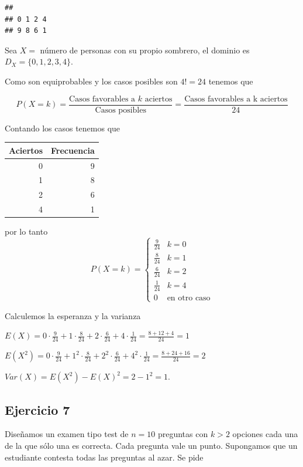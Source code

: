\documentclass[]{article}
\newenvironment{Shaded}{\begin{snugshade}}{\end{snugshade}}
\newcommand{\KeywordTok}[1]{\textcolor[rgb]{0.13,0.29,0.53}{\textbf{#1}}}
\newcommand{\NormalTok}[1]{#1}
\newcommand{\OperatorTok}[1]{\textcolor[rgb]{0.81,0.36,0.00}{\textbf{#1}}}
\begin{document}
\begin{Shaded}
\end{Shaded}

\begin{verbatim}
## 
## 0 1 2 4 
## 9 8 6 1
\end{verbatim}

Sea \(X=\) número de personas con su propio sombrero, el dominio es
\(D_X=\{0,1,2,3,4\}\).

Como son equiprobables y los casos posibles son \(4!=24\) tenemos que

\[P(X=k)=\frac{\mbox{Casos favorables a $k$ aciertos}}{\mbox{Casos posibles}}=\frac{\mbox{Casos favorables a k aciertos}}{24}\]

Contando los casos tenemos que

\begin{longtable}[]{@{}rr@{}}
\toprule
Aciertos & Frecuencia\tabularnewline
\midrule
\endhead
0 & 9\tabularnewline
1 & 8\tabularnewline
2 & 6\tabularnewline
4 & 1\tabularnewline
\bottomrule
\end{longtable}

por lo tanto \[P(X=k)=\left\{
\begin{array}{lr}
\frac{9}{24} & k=0\\
\frac{8}{24} & k=1\\
\frac{6}{24} & k=2\\
\frac{1}{24} & k=4\\
0 & \mbox{en otro caso}
\end{array}
\right.
\]

Calculemos la esperanza y la varianza

\(E(X)= 0\cdot \frac{9}{24} +1\cdot \frac{8}{24} + 2 \cdot \frac{6}{24} + 4 \cdot \frac{1}{24} =\frac{8+12+4}{24}=1\)

\(E(X^2)= 0\cdot \frac{9}{24} +1^2\cdot \frac{8}{24} + 2^2 \cdot \frac{6}{24} + 4^2 \cdot \frac{1}{24} =\frac{8+24+16}{24}=2\)

\(Var(X)=E(X^2)-E(X)^2=2-1^2=1\).

\hypertarget{ejercicio-7}{%
\subsection{Ejercicio 7}\label{ejercicio-7}}

Diseñamos un examen tipo test de \(n=10\) preguntas con \(k>2\) opciones
cada una de la que sólo una es correcta. Cada pregunta vale un punto.
Supongamos que un estudiante contesta todas las preguntas al azar. Se
pide
\end{document}
